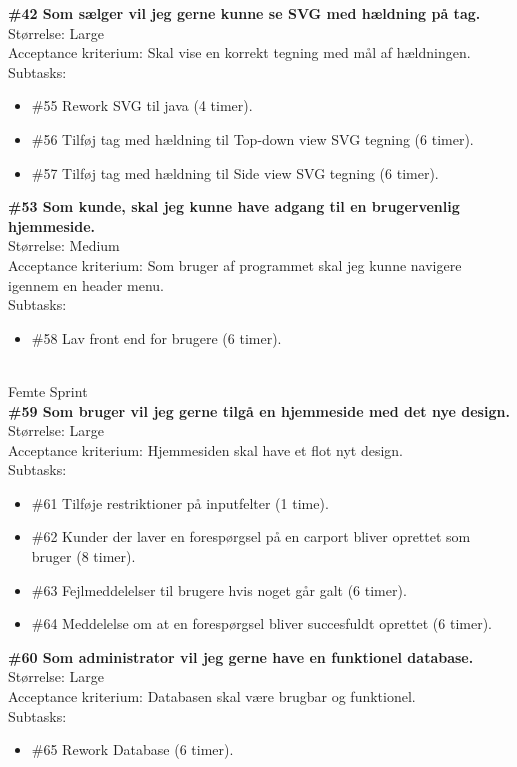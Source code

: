 \documentclass[11pt]{report}
\begin{document}
\textbf{\#42 Som sælger vil jeg gerne kunne se SVG med hældning på tag.}\\
Størrelse: Large\\
Acceptance kriterium: Skal vise en korrekt tegning med mål af hældningen. \\
Subtasks:
\begin{itemize}
\item \#55 Rework SVG til java (4 timer).
\item \#56 Tilføj tag med hældning til Top-down view SVG tegning (6 timer).
\item \#57 Tilføj tag med hældning til Side view SVG tegning (6 timer).
\end{itemize}
\textbf{\#53 Som kunde, skal jeg kunne have adgang til en brugervenlig hjemmeside.}\\
Størrelse: Medium\\
Acceptance kriterium: Som bruger af programmet skal jeg kunne navigere igennem en header menu. \\
Subtasks:
\begin{itemize}
\item \#58 Lav front end for brugere (6 timer).
\end{itemize}
\leavevmode
\\
Femte Sprint \\
\textbf{\#59 Som bruger vil jeg gerne tilgå en hjemmeside med det nye design. }\\
Størrelse: Large\\
Acceptance kriterium: Hjemmesiden skal have et flot nyt design. \\
Subtasks:
\begin{itemize}
\item \#61 Tilføje restriktioner på inputfelter (1 time).
\item \#62 Kunder der laver en forespørgsel på en carport bliver oprettet som bruger (8 timer).
\item \#63 Fejlmeddelelser til brugere hvis noget går galt (6 timer).
\item \#64 Meddelelse om at en forespørgsel bliver succesfuldt oprettet (6 timer).
\end{itemize}
\textbf{\#60 Som administrator vil jeg gerne have en funktionel database. }\\
Størrelse: Large\\
Acceptance kriterium: Databasen skal være brugbar og funktionel. \\
Subtasks:
\begin{itemize}
\item \#65 Rework Database (6 timer).
\end{itemize}
\end{document}
